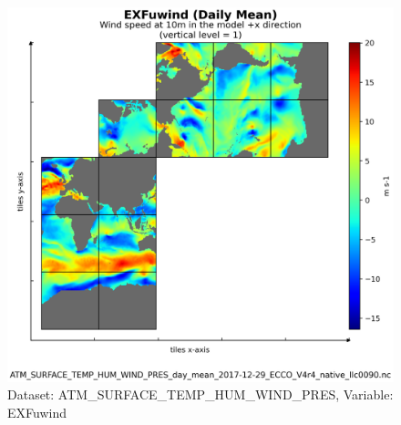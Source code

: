 \begin{figure}[H]
\centering
\includegraphics[scale=0.55]{../images/plots/v4r4/native_plots/Atmosphere_Surface_Temperature_Humidity_Wind_and_Pressure/EXFuwind.png}
\caption{Dataset: ATM\_SURFACE\_TEMP\_HUM\_WIND\_PRES, Variable: EXFuwind}
\label{tab:table-ATM_SURFACE_TEMP_HUM_WIND_PRES_EXFuwind-Plot}
\end{figure}
\newpage
\pagebreak
